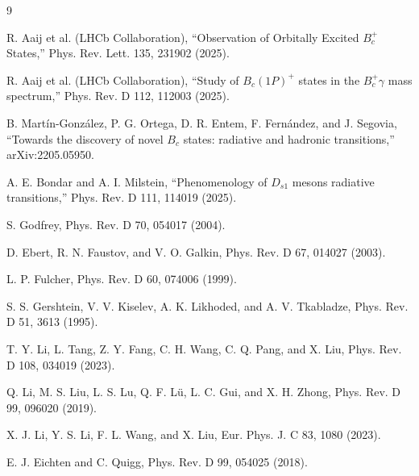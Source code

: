 \documentclass[11pt]{article}
\begin{document}
\begin{thebibliography}{9}

R. Aaij et al. (LHCb Collaboration),
``Observation of Orbitally Excited \(B_c^+\) States,''
Phys. Rev. Lett. 135, 231902 (2025).

R. Aaij et al. (LHCb Collaboration),
``Study of \(B_c(1P)^+\) states in the \(B_c^+\gamma\) mass spectrum,''
Phys. Rev. D 112, 112003 (2025).

B. Martín-González, P. G. Ortega, D. R. Entem,
F. Fernández, and J. Segovia,
``Towards the discovery of novel \(B_c\) states: radiative and hadronic
transitions,''
arXiv:2205.05950.

A. E. Bondar and A. I. Milstein,
``Phenomenology of \(D_{s1}\) mesons radiative transitions,''
Phys. Rev. D 111, 114019 (2025).

S. Godfrey,
Phys. Rev. D 70, 054017 (2004).

D. Ebert, R. N. Faustov, and V. O. Galkin,
Phys. Rev. D 67, 014027 (2003).

L. P. Fulcher,
Phys. Rev. D 60, 074006 (1999).

S. S. Gershtein, V. V. Kiselev, A. K. Likhoded, and A. V. Tkabladze,
Phys. Rev. D 51, 3613 (1995).

T. Y. Li, L. Tang, Z. Y. Fang, C. H. Wang, C. Q. Pang, and X. Liu,
Phys. Rev. D 108, 034019 (2023).

Q. Li, M. S. Liu, L. S. Lu, Q. F. Lü, L. C. Gui, and X. H. Zhong,
Phys. Rev. D 99, 096020 (2019).

X. J. Li, Y. S. Li, F. L. Wang, and X. Liu,
Eur. Phys. J. C 83, 1080 (2023).

E. J. Eichten and C. Quigg,
Phys. Rev. D 99, 054025 (2018).

\end{thebibliography}
\end{document}
